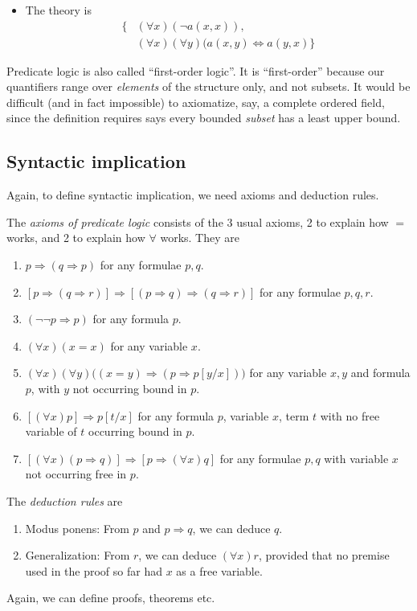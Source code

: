 \documentclass[a4paper]{article}
\begin{document}
\begin{eg}
\begin{enumerate}
\begin{itemize}
      \item The theory is
        \begin{align*}
          \{& (\forall x)(\neg a(x, x)),\\
            & (\forall x)(\forall y)(a(x, y)\Leftrightarrow a(y, x)\}
          \end{align*}
    \end{itemize}
\end{enumerate}
Predicate logic is also called ``first-order logic''. It is ``first-order'' because our quantifiers range over \emph{elements} of the structure only, and not subsets. It would be difficult (and in fact impossible) to axiomatize, say, a complete ordered field, since the definition requires says every bounded \emph{subset} has a least upper bound.
\end{eg}

\subsection{Syntactic implication}
Again, to define syntactic implication, we need axioms and deduction rules.
\begin{defi}
  The \emph{axioms of predicate logic} consists of the 3 usual axioms, 2 to explain how $=$ works, and 2 to explain how $\forall$ works. They are
  \begin{enumerate}[label=\arabic{*}.]
    \item $p\Rightarrow (q\Rightarrow p)$ for any formulae $p, q$.
    \item $[p\Rightarrow (q\Rightarrow r)] \Rightarrow [(p\Rightarrow q)\Rightarrow (q\Rightarrow r)]$ for any formulae $p, q, r$.
    \item $(\neg \neg p\Rightarrow p)$ for any formula $p$.
    \item $(\forall x)(x = x)$ for any variable $x$.
    \item $(\forall x)(\forall y)\big((x = y)\Rightarrow (p \Rightarrow p[y/x])\big)$ for any variable $x, y$ and formula $p$, with $y$ not occurring bound in $p$.
    \item $[(\forall x)p] \Rightarrow  p[t/x]$ for any formula $p$, variable $x$, term $t$ with no free variable of $t$ occurring bound in $p$.
    \item $[(\forall x)(p\Rightarrow q)]\Rightarrow [p\Rightarrow (\forall x)q]$ for any formulae $p, q$ with variable $x$ not occurring free in $p$.
  \end{enumerate}
  The \emph{deduction rules} are
  \begin{enumerate}[label=\arabic{*}.]
    \item Modus ponens: From $p$ and $p\Rightarrow q$, we can deduce $q$.
    \item Generalization: From $r$, we can deduce $(\forall x)r$, provided that no premise used in the proof so far had $x$ as a free variable.
  \end{enumerate}
\end{defi}
Again, we can define proofs, theorems etc.
\end{document}
